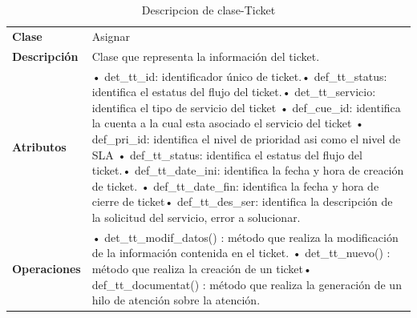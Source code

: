 \begin{table}[H]
	\centering
	\caption{Descripcion de clase-Ticket}
	\begin{tabular}{|p{6.145em}|p{28.07em}|}
		\toprule
		\rowcolor[rgb]{ .125,  .216,  .392} \multicolumn{2}{|p{34.215em}|}{\textcolor[rgb]{ 1,  1,  1}{\textbf{Clase Ticket}}} \\
		\midrule
		\textbf{Clase} & \multicolumn{1}{l|}{Asignar} \\
		\midrule
		\textbf{Descripción} & Clase que representa la información del ticket. \\
		\midrule
		\textbf{Atributos } & •	det\_tt\_id: identificador único de ticket.\newline{}•	def\_tt\_status: identifica el estatus del flujo del ticket.\newline{}•	det\_tt\_servicio: identifica el tipo de servicio del ticket \newline{}•	def\_cue\_id: identifica la cuenta a la cual esta asociado el servicio del ticket \newline{}•	def\_pri\_id: identifica el nivel de prioridad asi como el nivel de SLA \newline{}•	def\_tt\_status: identifica el estatus del flujo del ticket.\newline{}•	def\_tt\_date\_ini: identifica la fecha y hora de creación de ticket. \newline{}•	def\_tt\_date\_fin: identifica la fecha y hora de cierre de ticket\newline{}•	def\_tt\_des\_ser: identifica la descripción de la solicitud del servicio, error a solucionar.  \\
		\midrule
		\textbf{Operaciones} & •	det\_tt\_modif\_datos() :  método que realiza la modificación de la información contenida en el ticket. \newline{}•	det\_tt\_nuevo() : método que realiza la creación de un ticket\newline{}•	def\_tt\_documentat()   : método que realiza la generación de un hilo de atención sobre la atención. \\
		\bottomrule
	\end{tabular}%
	\label{tab:clas8}%
\end{table}%



